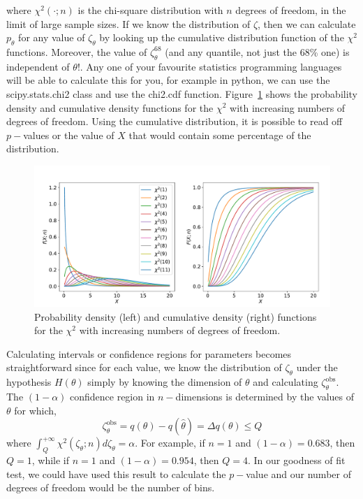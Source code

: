 where $\chi^{2}(\cdot;n)$ is the chi-square distribution with $n$ degrees of freedom, in the limit of large sample sizes. 
If we know the distribution of $\zeta$, then we can calculate $p_{\theta}$ for any value of $\zeta_{\theta}$ by looking up the cumulative distribution function of the $\chi^2$ functions. Moreover, the value of $\zeta^{68}_\theta$ (and any quantile, not just the 68\% one) is independent of $\theta$!. Any one of your favourite statistics programming languages will be able to calculate this for you, for example in python, we can use the \textsf{scipy.stats.chi2} class and use the \textsf{chi2.cdf} function. Figure~\ref{fig:chisquare} shows the probability density and cumulative density functions for the $\chi^{2}$ with increasing numbers of degrees of freedom. Using the cumulative distribution, it is possible to read off $p-$values or the value of $X$ that would contain some percentage of the distribution. 
\begin{figure}[hbt!]
    \centering
    \includegraphics[width=\textwidth]{figures/Intervals/chi2dists.pdf}
    \caption{Probability density (left) and cumulative density (right) functions for the $\chi^{2}$ with increasing numbers of degrees of freedom.}
    \label{fig:chisquare}
\end{figure}
Calculating intervals or confidence regions for parameters becomes straightforward since for each value, we know the distribution of $\zeta_{\theta}$ under the hypothesis $H(\theta)$ simply by knowing the dimension of $\theta$ and calculating $\zeta_{\theta}^{\mathrm{obs}}$. The $(1-\alpha)$ confidence region in $n-$dimensions is determined by the values of $\theta$ for which,
\begin{equation}
    \zeta_{\theta}^{\mathrm{obs}}=q(\theta)-q(\hat{\theta})=
    \Delta q(\theta) \leq Q
\end{equation}
where $\int_{Q}^{+\infty} \chi^{2}(\zeta_{\theta};n)d\zeta_{\theta} = \alpha$. For example, if $n=1$ and $(1-\alpha)=0.683$, then  $Q=1$, while if $n=1$ and $(1-\alpha)=0.954$, then $Q=4$. In our goodness of fit test, we could have used this result to calculate the $p-$value and our number of degrees of freedom would be the number of bins. 

